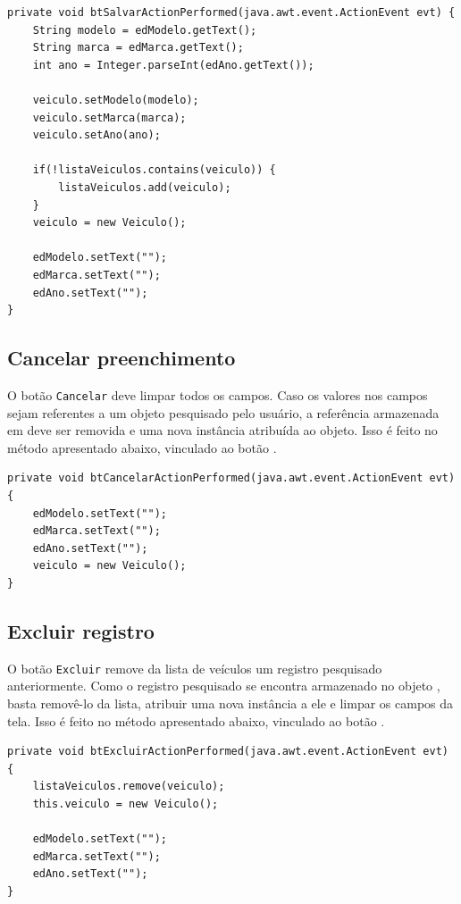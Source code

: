 \begin{verbatim}
private void btSalvarActionPerformed(java.awt.event.ActionEvent evt) {
	String modelo = edModelo.getText();
	String marca = edMarca.getText();
	int ano = Integer.parseInt(edAno.getText());
	
	veiculo.setModelo(modelo);
	veiculo.setMarca(marca);
	veiculo.setAno(ano);
	
	if(!listaVeiculos.contains(veiculo)) {
		listaVeiculos.add(veiculo);
	}
	veiculo = new Veiculo();
	
	edModelo.setText("");
	edMarca.setText("");
	edAno.setText("");
}
\end{verbatim}

\subsection{Cancelar preenchimento}

O botão \texttt{Cancelar} deve limpar todos os campos. Caso os valores nos campos sejam referentes a um objeto pesquisado pelo usuário, a referência armazenada em  deve ser removida e uma nova instância atribuída ao objeto. Isso é feito no método apresentado abaixo, vinculado ao botão .

\begin{verbatim}
private void btCancelarActionPerformed(java.awt.event.ActionEvent evt) {
	edModelo.setText("");
	edMarca.setText("");
	edAno.setText("");
	veiculo = new Veiculo();
}
\end{verbatim}

\subsection{Excluir registro}

O botão \texttt{Excluir} remove da lista de veículos um registro pesquisado anteriormente. Como o registro pesquisado se encontra armazenado no objeto , basta removê-lo da lista, atribuir uma nova instância a ele e limpar os campos da tela. Isso é feito no método apresentado abaixo, vinculado ao botão .

\begin{verbatim}
private void btExcluirActionPerformed(java.awt.event.ActionEvent evt) {
	listaVeiculos.remove(veiculo);
	this.veiculo = new Veiculo();

	edModelo.setText("");
	edMarca.setText("");
	edAno.setText("");
}
\end{verbatim}

